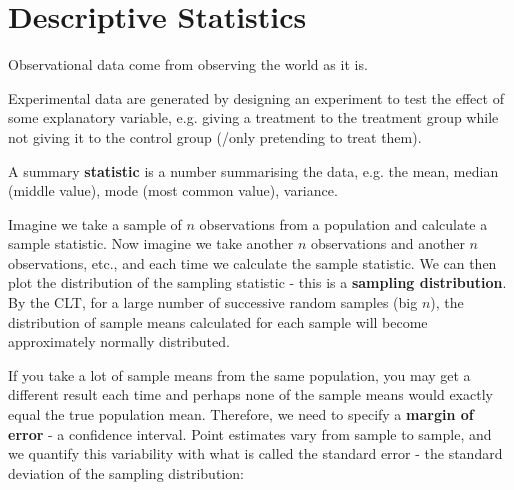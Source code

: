 \section{Descriptive Statistics}

\begin{paracol}{2}

\begin{center}
\end{center}

\switchcolumn

Observational data come from observing the world as it is.

Experimental data are generated by designing an experiment to test the effect of some explanatory variable, e.g. giving a treatment to the treatment group while not giving it to the control group (/only pretending to treat them).

A summary \textbf{statistic} is a number summarising the data, e.g. the mean, median (middle value), mode (most common value), variance.

\end{paracol}

Imagine we take a sample of $n$ observations from a population and calculate a sample statistic. Now imagine we take another $n$ observations and another $n$ observations, etc., and each time we calculate the sample statistic. We can then plot the distribution of the sampling statistic - this is a \textbf{sampling distribution}. By the CLT, for a large number of successive random samples (big $n$), the distribution of sample means calculated for each sample will become approximately normally distributed.

If you take a lot of sample means from the same population, you may get a different result each time and perhaps none of the sample means would exactly equal the true population mean. Therefore, we need to specify a \textbf{margin of error} - a confidence interval. Point estimates vary from sample to sample, and we quantify this variability with what is called the standard error - the standard deviation of the sampling distribution:

